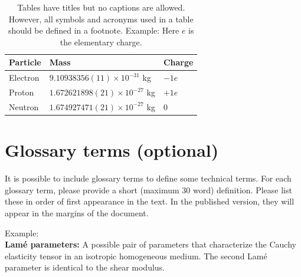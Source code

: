 \documentclass[fleqn,10pt]{wlscirep}
\begin{document}
\begin{table}[ht]
\centering
\begin{tabular}{|l|l|l|}
\hline
Particle & Mass & Charge \\
\hline
Electron & $9.10938356(11)\times10^{-31}$ kg & $-1e$ \\
\hline
Proton & $1.672621898(21)\times10^{-27}$ kg & $+1e$ \\
\hline
Neutron & $1.674927471(21)\times10^{-27}$ kg & $0$ \\
\hline
\end{tabular}
\caption{\label{tab}Tables have titles but no captions are allowed. However, all symbols and acronyms used in a table should be defined in a footnote. Example: Here $e$ is the elementary charge.}
\end{table}

\section*{Glossary terms (optional)}
It is possible  to include glossary terms to define some technical terms. For each glossary term, please provide a short (maximum 30 word) definition. Please list these in order of first appearance in the text. In the published version, they will appear in the margins of the document. 

Example: \\
\textbf{Lam\'e parameters:} A possible pair of parameters that characterize the Cauchy elasticity tensor in an isotropic homogeneous medium. The second Lam\'e parameter is identical to the shear modulus.
\end{document}
